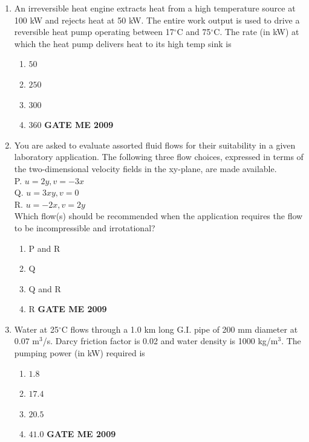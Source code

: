 \documentclass[journal]{IEEEtran}
\begin{document}
\begin{enumerate}[leftmargin=0pt]
\item An irreversible heat engine extracts heat from a high temperature source at 100 kW and rejects heat at 50 kW. The entire work output is used to drive a reversible heat pump operating between 17$^\circ$C and 75$^\circ$C. The rate (in kW) at which the heat pump delivers heat to its high temp sink is
\begin{enumerate}[label=(\Alph*)]
  \item $50$
  \item $250$
  \item $300$
  \item $360$
\hfill{\textbf{GATE ME 2009}}
\end{enumerate}

\item You are asked to evaluate assorted fluid flows for their suitability in a given laboratory application.
The following three flow choices, expressed in terms of the two-dimensional velocity fields in the
xy-plane, are made available.\\
P. $u =2y, v =-3x$\\
Q. $u =3xy, v = 0$\\
R. $u=-2x, v=2y$\\
Which flow(s) should be recommended when the application requires the flow to be incompressible and
irrotational?

\begin{enumerate}[label=(\Alph*)]
  \item P and R
  \item Q
  \item Q and R
  \item R
\hfill{\textbf{GATE ME 2009}}
\end{enumerate}

\item Water at 25$^\circ$C flows through a 1.0 km long G.I. pipe of 200 mm diameter at $0.07$ m$^3$/s. Darcy friction factor is 0.02 and water density is 1000 kg/m$^3$. The pumping power (in kW) required is
\begin{enumerate}[label=(\Alph*)]
  \item $1.8$
  \item $17.4$
  \item $20.5$
  \item $41.0$
\hfill{\textbf{GATE ME 2009}}
\end{enumerate}









\end{enumerate}
\end{document}
